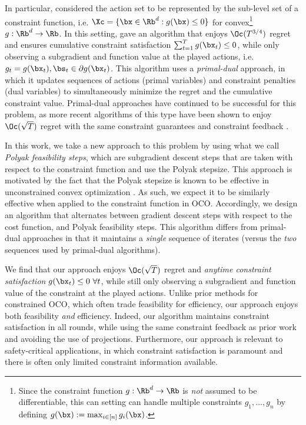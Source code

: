 In particular, \citet{mahdavi2012trading} considered the action set to be represented by the sub-level set of a constraint function, i.e. $\Xc = \{ \bx \in \Rb^d : g(\bx) \leq 0 \}$ for convex\footnote{Since the constraint function $g : \Rb^d \rightarrow \Rb$ is \emph{not} assumed to be differentiable, this can setting can handle multiple constraints $g_1,...,g_n$ by defining $g(\bx) := \max_{i \in [n]} g_i (\bx)$.} $g:\Rb^d \rightarrow \Rb$.
In this setting, \citet{mahdavi2012trading} gave an algorithm that enjoys $\Oc(T^{3/4})$ regret and ensures cumulative constraint satisfaction $\sum_{t=1}^{T} g(\bx_t) \leq 0$, while only observing a subgradient and function value at the played actions, i.e. $g_t = g(\bx_t), \bs_t \in \partial g(\bx_t)$.
This algorithm uses a \emph{primal-dual} approach, in which it updates sequences of actions (primal variables) and constraint penalties (dual variables) to simultaneously minimize the regret and the cumulative constraint value. 
Primal-dual approaches have continued to be successful for this problem, as more recent algorithms of this type have been shown to enjoy $\Oc(\sqrt{T})$ regret with the same constraint guarantees and constraint feedback \cite{yu2017online}.

In this work, we take a new approach to this problem by using what we call \emph{Polyak feasibility steps}, which are subgradient descent steps that are taken with respect to the constraint function and use the Polyak stepsize.
This approach is motivated by the fact that the Polyak stepsize is known to be effective in unconstrained convex optimization \cite{polyak1969minimization}.
As such, we expect it to be similarly effective when applied to the constraint function in OCO.
Accordingly, we design an algorithm that alternates between gradient descent steps with respect to the cost function, and Polyak feasibility steps.
This algorithm differs from primal-dual approaches in that it maintains a \textit{single} sequence of iterates (versus the \textit{two} sequences used by primal-dual algorithms).

We find that our approach enjoys $\Oc(\sqrt{T})$ regret and \emph{anytime constraint satisfaction} $g(\bx_t) \leq 0 \ \forall t$, while still only observing a subgradient and function value of the constraint at the played actions.
Unlike prior methods for constrained OCO, which often trade feasibility for efficiency, our approach enjoys both feasibility \emph{and} efficiency.
Indeed, our algorithm maintains constraint satisfaction in all rounds, while using the same constraint feedback as prior work and avoiding the use of projections.
Furthermore, our approach is relevant to safety-critical applications, in which constraint satisfaction is paramount and there is often only limited constraint information available.

